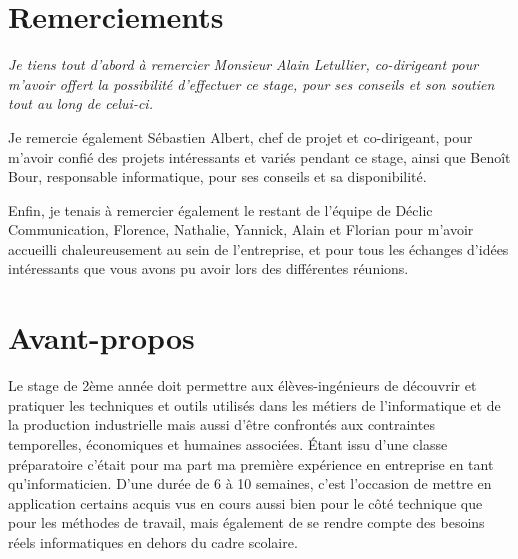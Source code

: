 \documentclass[report]{tnreport}
\begin{document}
\maketitle
{}


\cleardoublepage

\makesecondtitle

\section*{Remerciements}




{\em
Je tiens tout d'abord à remercier Monsieur Alain Letullier, co-dirigeant pour m'avoir offert la possibilité d'effectuer ce stage, pour ses conseils et son soutien tout au long de celui-ci. 

Je remercie également Sébastien Albert, chef de projet et co-dirigeant, pour m'avoir confié des projets intéressants et variés pendant ce stage, ainsi que Benoît Bour, responsable informatique, pour ses conseils et sa disponibilité.

Enfin, je tenais à remercier également le restant de l'équipe de Déclic Communication, Florence, Nathalie, Yannick, Alain et Florian pour m'avoir accueilli chaleureusement au sein de l'entreprise, et pour tous les échanges d'idées intéressants que vous avons pu avoir lors des différentes réunions.
}


\section*{Avant-propos}

Le stage de 2ème année doit permettre aux élèves-ingénieurs de découvrir et pratiquer les techniques et outils utilisés dans les métiers de l’informatique et de la production industrielle mais aussi d’être confrontés aux contraintes temporelles, économiques et humaines associées. 
Étant issu d’une classe préparatoire c’était pour ma part ma première expérience en entreprise en tant qu’informaticien. D’une durée de 6 à 10 semaines, c’est l'occasion de mettre en application certains acquis vus en cours aussi bien pour le côté technique que pour les méthodes de travail, mais également de se rendre compte des besoins réels informatiques en dehors du cadre scolaire.
\end{document}
